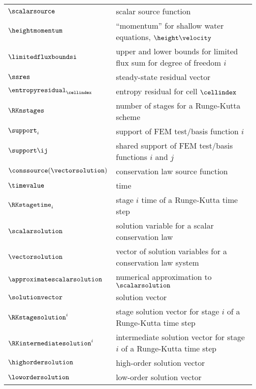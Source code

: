 \begin{center}
\begin{longtable}{l p{4.8in}}
$\scalarsource$    & scalar source function\\
$\heightmomentum$  & ``momentum'' for shallow water equations,
                     $\height\velocity$\\
$\limitedfluxboundsi$ & upper and lower bounds for limited flux sum for degree
                        of freedom $i$\\
$\ssres$           & steady-state residual vector\\
$\entropyresidual_\cellindex$ & entropy residual for cell $\cellindex$\\
$\RKnstages$       & number of stages for a Runge-Kutta scheme\\
$\support_i$       & support of FEM test/basis function $i$\\
$\support\ij$      & shared support of FEM test/basis functions $i$ and $j$\\
$\conssource(\vectorsolution)$ & conservation law source function\\
$\timevalue$       & time\\

$\RKstagetime_i$   & stage $i$ time of a Runge-Kutta time step\\
$\scalarsolution$  & solution variable for a scalar conservation law\\
$\vectorsolution$  & vector of solution variables for a conservation law
                     system\\
$\approximatescalarsolution$ & numerical approximation to $\scalarsolution$\\
$\solutionvector$  & solution vector\\
$\RKstagesolution^i$ & stage solution vector for stage $i$ of a Runge-Kutta time
                       step\\
$\RKintermediatesolution^i$ & intermediate solution vector for stage $i$ of a
                              Runge-Kutta time step\\
$\highordersolution$ & high-order solution vector\\
$\lowordersolution$ & low-order solution vector\\


\end{longtable}
\end{center}
